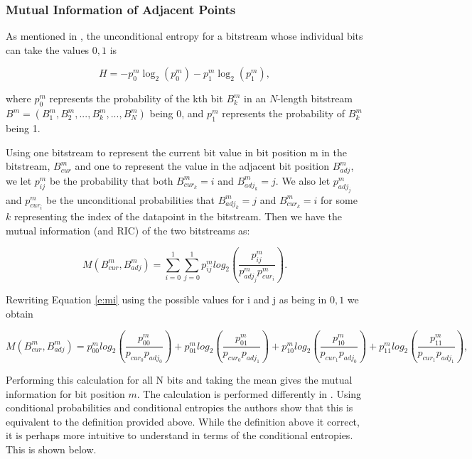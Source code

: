 \subsubsection{Mutual Information of Adjacent Points}

As mentioned in \cite{klower}, the unconditional entropy for a bitstream whose individual bits can take the values ${0, 1}$ is 

\begin{equation}
H = -p_{0}^m\log_2(p_0^m) - p_{1}^m\log_2(p_1^m), 
\label{H_uncond}
\end{equation}

where $p_0^m$ represents the probability of the kth bit $B_k^m$ in an $N$-length bitstream $B^m = (B_1^m, B_2^m,...,B_k^m, ..., B_N^m)$ being 0, and $p_1^m$ represents the probability of $B_k^m$ being 1.

Using one bitstream to represent the current bit value in bit position m in the bitstream, $B_{cur}^m$ and one to represent the value in the adjacent bit position $B_{adj}^m$, we let $p_{ij}^m$ be the probability that both $B_{cur_k}^m = i$ and $B_{adj_k}^m = j$. We also let $p_{adj_j}^m$ and $p_{cur_i}^m$ be the unconditional probabilities that $B_{adj_k}^m = j$ and $B_{cur_k}^m = i$ for some $k$ representing the index of the datapoint in the bitstream. Then we have the mutual information (and RIC) of the two bitstreams as:

\begin{equation} \label{e:mi}
M(B_{cur}^m, B_{adj}^m) = \sum_{i=0}^1\sum_{j=0}^1 p_{ij}^mlog_2 (\frac{p_{ij}^m}{p_{adj_j}^mp_{cur_i}^m}).
\end{equation}

Rewriting Equation \ref{e:mi} using the possible values for i and j as being in ${0, 1}$ we obtain 

\begin{equation} \label{e:mi3}
M(B_{cur}^m, B_{adj}^m) = p_{00}^mlog_2(\frac{p_{00}^m}{p_{cur_0}p_{adj_0}}) +
p_{01}^mlog_2(\frac{p_{01}^m}{p_{cur_0}p_{adj_1}}) +
p_{10}^mlog_2(\frac{p_{10}^m}{p_{cur_1}p_{adj_0}}) +
p_{11}^mlog_2(\frac{p_{11}^m}{p_{cur_1}p_{adj_1}}), 
\end{equation}

Performing this calculation for all N bits and taking the mean gives the mutual information for bit position $m$. The calculation is performed differently in \cite{klower}. Using conditional probabilities and conditional entropies  the authors show that this is equivalent to the definition provided above. While the definition above it correct, it is perhaps more intuitive to understand in terms of the conditional entropies. This is shown below.

